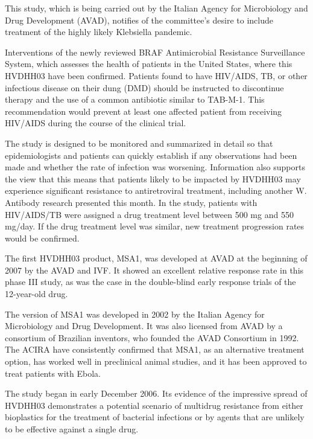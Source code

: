 \documentclass{article}
\begin{document}
This study, which is being carried out by the Italian Agency for Microbiology and Drug Development (AVAD), notifies of the committee’s desire to include treatment of the highly likely Klebsiella pandemic.

Interventions of the newly reviewed BRAF Antimicrobial Resistance Surveillance System, which assesses the health of patients in the United States, where this HVDHH03 have been confirmed. Patients found to have HIV/AIDS, TB, or other infectious disease on their dung (DMD) should be instructed to discontinue therapy and the use of a common antibiotic similar to TAB-M-1. This recommendation would prevent at least one affected patient from receiving HIV/AIDS during the course of the clinical trial.

The study is designed to be monitored and summarized in detail so that epidemiologists and patients can quickly establish if any observations had been made and whether the rate of infection was worsening. Information also supports the view that this means that patients likely to be impacted by HVDHH03 may experience significant resistance to antiretroviral treatment, including another W. Antibody research presented this month. In the study, patients with HIV/AIDS/TB were assigned a drug treatment level between 500 mg and 550 mg/day. If the drug treatment level was similar, new treatment progression rates would be confirmed.

The first HVDHH03 product, MSA1, was developed at AVAD at the beginning of 2007 by the AVAD and IVF. It showed an excellent relative response rate in this phase III study, as was the case in the double-blind early response trials of the 12-year-old drug.

The version of MSA1 was developed in 2002 by the Italian Agency for Microbiology and Drug Development. It was also licensed from AVAD by a consortium of Brazilian inventors, who founded the AVAD Consortium in 1992. The ACIRA have consistently confirmed that MSA1, as an alternative treatment option, has worked well in preclinical animal studies, and it has been approved to treat patients with Ebola.

The study began in early December 2006. Its evidence of the impressive spread of HVDHH03 demonstrates a potential scenario of multidrug resistance from either bioplastics for the treatment of bacterial infections or by agents that are unlikely to be effective against a single drug.
\end{document}
